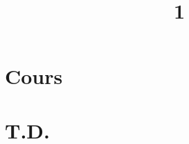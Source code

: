 \documentclass[a4paper]{article}
\title{1}{Séries numériques}
\begin{document}
	\part{Cours}
	
	
	
	
	
	\clearpage\null\clearpage
	\renewcommand{\thesection}{}
	\renewcommand{\thesubsection}{}
	\part{T.D.}
	
	
\end{document}
